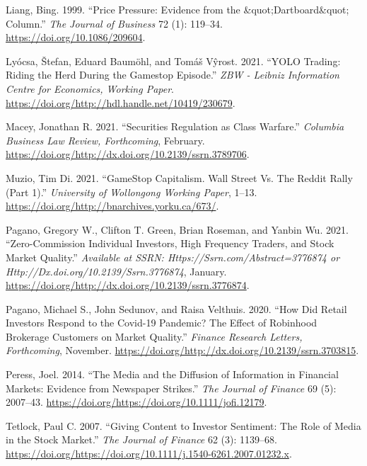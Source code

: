 \documentclass[12pt,]{article}
\begin{document}
\leavevmode\hypertarget{ref-liang1999}{}%
Liang, Bing. 1999. ``Price Pressure: Evidence from the
\&quot;Dartboard\&quot; Column.'' \emph{The Journal of Business} 72 (1):
119--34. \url{https://doi.org/10.1086/209604}.

\leavevmode\hypertarget{ref-lyocsa2021}{}%
Lyócsa, Štefan, Eduard Baumöhl, and Tomáš Vŷrost. 2021. ``YOLO Trading:
Riding the Herd During the Gamestop Episode.'' \emph{ZBW - Leibniz
Information Centre for Economics, Working Paper}.
\url{https://doi.org/http://hdl.handle.net/10419/230679}.

\leavevmode\hypertarget{ref-macey2021}{}%
Macey, Jonathan R. 2021. ``Securities Regulation as Class Warfare.''
\emph{Columbia Business Law Review, Forthcoming}, February.
\url{https://doi.org/http://dx.doi.org/10.2139/ssrn.3789706}.

\leavevmode\hypertarget{ref-dimuzio2021}{}%
Muzio, Tim Di. 2021. ``GameStop Capitalism. Wall Street Vs. The Reddit
Rally (Part 1).'' \emph{University of Wollongong Working Paper}, 1--13.
\url{https://doi.org/http://bnarchives.yorku.ca/673/}.

\leavevmode\hypertarget{ref-eaton2021}{}%
Pagano, Gregory W., Clifton T. Green, Brian Roseman, and Yanbin Wu.
2021. ``Zero-Commission Individual Investors, High Frequency Traders,
and Stock Market Quality.'' \emph{Available at SSRN:
Https://Ssrn.com/Abstract=3776874 or
Http://Dx.doi.org/10.2139/Ssrn.3776874}, January.
\url{https://doi.org/http://dx.doi.org/10.2139/ssrn.3776874}.

\leavevmode\hypertarget{ref-pagano2020}{}%
Pagano, Michael S., John Sedunov, and Raisa Velthuis. 2020. ``How Did
Retail Investors Respond to the Covid-19 Pandemic? The Effect of
Robinhood Brokerage Customers on Market Quality.'' \emph{Finance
Research Letters, Forthcoming}, November.
\href{https://doi.org/http://dx.doi.org/10.2139/ssrn.3703815\%20}{https://doi.org/http://dx.doi.org/10.2139/ssrn.3703815}.

\leavevmode\hypertarget{ref-peress2014}{}%
Peress, Joel. 2014. ``The Media and the Diffusion of Information in
Financial Markets: Evidence from Newspaper Strikes.'' \emph{The Journal
of Finance} 69 (5): 2007--43.
\url{https://doi.org/https://doi.org/10.1111/jofi.12179}.

\leavevmode\hypertarget{ref-tetlock2007}{}%
Tetlock, Paul C. 2007. ``Giving Content to Investor Sentiment: The Role
of Media in the Stock Market.'' \emph{The Journal of Finance} 62 (3):
1139--68.
\url{https://doi.org/https://doi.org/10.1111/j.1540-6261.2007.01232.x}.
\end{document}
